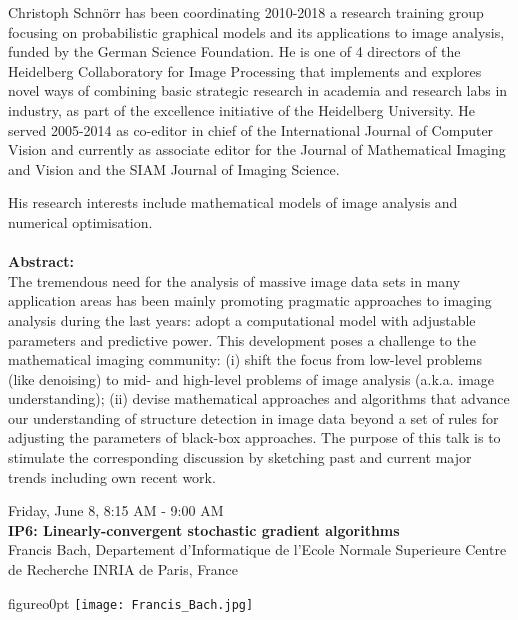 Christoph Schn\"{o}rr has been coordinating 2010-2018 a research training group focusing on probabilistic graphical models and its applications to image analysis, funded by the German Science Foundation. He is one of 4 directors of the Heidelberg Collaboratory for Image Processing that implements and explores novel ways of combining basic strategic research in academia and research labs in industry, as part of the excellence initiative of the Heidelberg University. He served 2005-2014 as co-editor in chief of the International Journal of Computer Vision and currently as associate editor for the Journal of Mathematical Imaging and Vision and the SIAM Journal of Imaging Science.

His research interests include mathematical models of image analysis and numerical optimisation.\\\\
\textbf{Abstract:}\\
The tremendous need for the analysis of massive image data sets in many application areas has been mainly promoting pragmatic approaches to imaging analysis during the last years: adopt a computational model with adjustable parameters and predictive power. This development poses a challenge to the mathematical imaging community: (i) shift the focus from low-level problems (like denoising) to mid- and high-level problems of image analysis (a.k.a. image understanding); (ii) devise mathematical approaches and algorithms that advance our understanding of structure detection in image data beyond a set of rules for adjusting the parameters of black-box approaches. The purpose of this talk is to stimulate the corresponding discussion by sketching past and current major trends including own recent work.

\newpage\vspace{2cm}
\begin{center}{\Large{
Friday, June 8, 8:15 AM - 9:00 AM \\
\textbf{IP6: Linearly-convergent stochastic gradient algorithms}\\
Francis Bach, Departement d'Informatique de l'Ecole Normale Superieure Centre de Recherche INRIA de Paris, France}}
\end{center}
\vspace{1cm}

\begin{wrapfloat}{figure}{o}{0pt}
\texttt{[image: Francis\_Bach.jpg]}
\end{wrapfloat}

